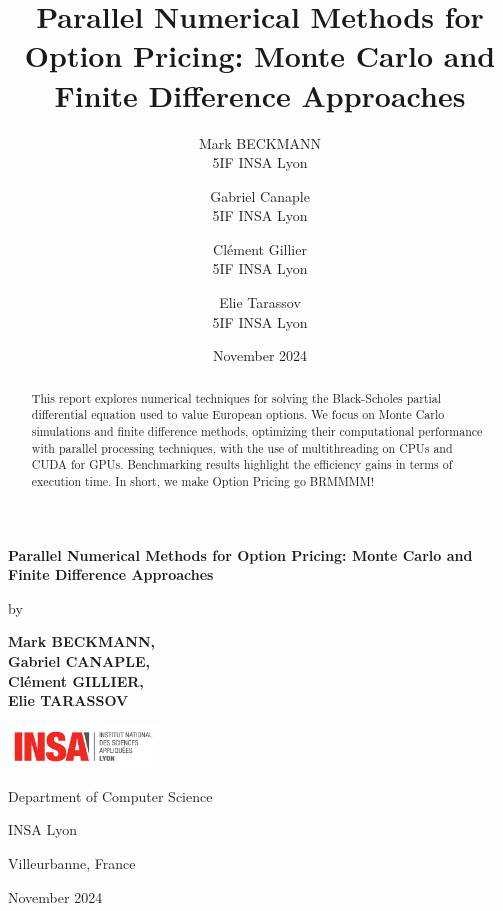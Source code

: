 \documentclass[12pt,a4paper]{report}
\title{\textbf{Parallel Numerical Methods for Option Pricing: Monte Carlo and Finite Difference Approaches}}
\author{
    Mark BECKMANN \\ 5IF INSA Lyon
    \and
    Gabriel Canaple \\ 5IF INSA Lyon
    \and
    Clément Gillier \\ 5IF INSA Lyon
    \and
    Elie Tarassov \\ 5IF INSA Lyon
}
\date{November 2024}
\newcommand{\thesistitle}{Parallel Numerical Methods for Option Pricing: Monte Carlo and Finite Difference Approaches}
\newcommand{\myname}{
    Mark BECKMANN, \\Gabriel CANAPLE, \\Clément GILLIER, \\Elie TARASSOV}
\newcommand{\thesisdate}{November 2024}
\begin{document}
\begin{titlepage}
    \centering
    \vspace*{4cm}
     {\huge \textbf{\thesistitle} \par}
      \vspace{2cm}
     {\large  by \par}
     \vspace{0.5cm}
     {\large \textbf{\myname} \par}
     \vspace{2cm}
    \includegraphics[width=0.3\textwidth]{insa.png}\par
    \vspace{1cm}
    {\large \sc Department of Computer Science \par}

     {\large \sc INSA Lyon  \par}

     {\large \sc Villeurbanne, France \par}
    \vspace{0.5cm}
    {\large \sc \thesisdate \par}
    \vspace{2cm}
   
\end{titlepage}





\begin{abstract}

This report explores numerical techniques for solving the Black-Scholes partial differential equation used to value European options. We focus on Monte Carlo simulations and finite difference methods, optimizing their computational performance with parallel processing techniques, with the use of multithreading on CPUs and CUDA for GPUs. Benchmarking results highlight the efficiency gains in terms of execution time.
In short, we make Option Pricing go BRMMMM!
\end{abstract}
\newpage
\end{document}
